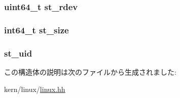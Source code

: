 \label{structLinux_1_1tgt__stat64_ab77c257c135fa586e930ef0bf0977c08}
\hypertarget{structLinux_1_1tgt__stat64_ac430407fd3b0e421da1ee8f66c95a786}{
\subsubsection[{st\_\-rdev}]{\setlength{\rightskip}{0pt plus 5cm}uint64\_\-t {\bf st\_\-rdev}}}
\label{structLinux_1_1tgt__stat64_ac430407fd3b0e421da1ee8f66c95a786}
\hypertarget{structLinux_1_1tgt__stat64_aec608d79c93ed6d010aec9f7487e0064}{
\subsubsection[{st\_\-size}]{\setlength{\rightskip}{0pt plus 5cm}int64\_\-t {\bf st\_\-size}}}
\label{structLinux_1_1tgt__stat64_aec608d79c93ed6d010aec9f7487e0064}
\hypertarget{structLinux_1_1tgt__stat64_ad5477a292a4edf27aa5766e01e0f5d1f}{
\subsubsection[{st\_\-uid}]{ {\bf st\_\-uid}}}
\label{structLinux_1_1tgt__stat64_ad5477a292a4edf27aa5766e01e0f5d1f}


この構造体の説明は次のファイルから生成されました:\begin{DoxyCompactItemize}
\item 
kern/linux/\hyperlink{kern_2linux_2linux_8hh}{linux.hh}\end{DoxyCompactItemize}
